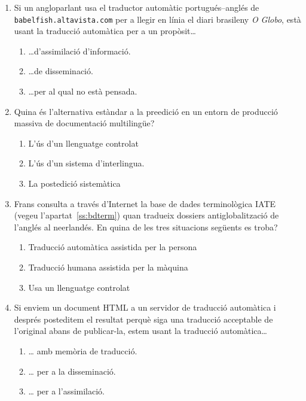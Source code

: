\begin{enumerate}
\item Si un angloparlant usa el traductor automàtic
   portugués--anglés de \verb|babelfish.altavista.com| 
   per a llegir en línia el diari brasileny \emph{O Globo},
   està usant la traducció automàtica per a un propòsit\ldots
   
\begin{enumerate}
\item \ldots d'assimilació d'informació.
\item \ldots de disseminació.
\item \ldots per al qual no està pensada.
\end{enumerate}
\item Quina és l'alternativa estàndar a la preedició en un entorn
   de producció massiva de documentació multilingüe?
   
\begin{enumerate}
\item L'ús d'un llenguatge controlat
\item L'ús d'un sistema d'interlingua.
\item La postedició sistemàtica
\end{enumerate}
\item Frans consulta a través d'Internet la base de dades terminològica
   IATE (vegeu l'apartat~\ref{ss:bdterm}) quan tradueix dossiers antiglobalització de l'anglés
   al neerlandés. En quina de les tres situacions següents es troba?
   
\begin{enumerate}
\item Traducció automàtica assistida per la persona
\item Traducció humana assistida per la màquina
\item Usa un llenguatge controlat
\end{enumerate}


\item Si enviem un document HTML a un servidor de traducció automàtica
  i després posteditem el resultat perquè siga una traducció
  acceptable de l'original abans de publicar-la, estem usant la
  traducció automàtica{\ldots}
   
\begin{enumerate}
\item {\ldots} amb memòria de traducció.
\item {\ldots} per a la disseminació.
\item {\ldots} per a l'assimilació.
\end{enumerate}


\end{enumerate}
